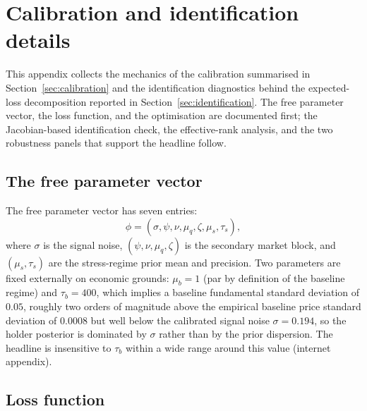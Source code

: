 \section{Calibration and identification details}\label{app:calib_details}

This appendix collects the mechanics of the calibration summarised in Section~\ref{sec:calibration} and the identification diagnostics behind the expected-loss decomposition reported in Section~\ref{sec:identification}. The free parameter vector, the loss function, and the optimisation are documented first; the Jacobian-based identification check, the effective-rank analysis, and the two robustness panels that support the headline follow.

\subsection{The free parameter vector}\label{sub:free_params}

The free parameter vector has seven entries:
\begin{equation}\label{eq:phi}
\phi = (\sigma, \psi, \nu, \mu_q, \zeta, \mu_s, \tau_s),
\end{equation}
where $\sigma$ is the signal noise, $(\psi, \nu, \mu_q, \zeta)$ is the secondary market block, and $(\mu_s, \tau_s)$ are the stress-regime prior mean and precision. Two parameters are fixed externally on economic grounds: $\mu_b = 1$ (par by definition of the baseline regime) and $\tau_b = 400$, which implies a baseline fundamental standard deviation of $0.05$, roughly two orders of magnitude above the empirical baseline price standard deviation of $0.0008$ but well below the calibrated signal noise $\sigma = 0.194$, so the holder posterior is dominated by $\sigma$ rather than by the prior dispersion. The headline is insensitive to $\tau_b$ within a wide range around this value (internet appendix).

\subsection{Loss function}\label{sub:loss}


